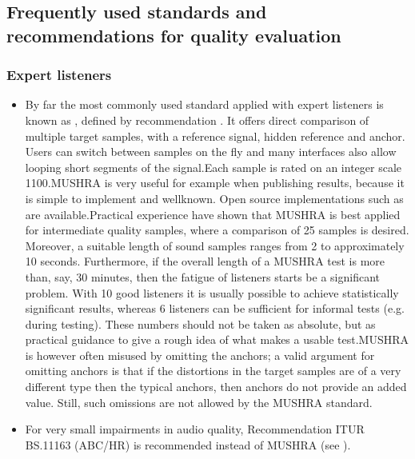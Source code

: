 \documentclass[letterpaper,10pt,english]{jupyterBook}
\begin{document}
\subsection{Frequently used standards and recommendations for quality evaluation}
\label{\detokenize{Evaluation/Subjective_quality_evaluation:frequently-used-standards-and-recommendations-for-quality-evaluation}}

\subsubsection{Expert listeners}
\label{\detokenize{Evaluation/Subjective_quality_evaluation:expert-listeners}}\begin{itemize}
\item {} 
\sphinxAtStartPar
By far the most commonly used standard applied with expert listeners
is known as , defined by
 recommendation
. It offers
direct comparison of multiple target samples, with a reference
signal, hidden reference and anchor. Users can switch between
samples on the fly and many interfaces also allow looping short
segments of the signal.Each sample is rated on an integer scale 1\sphinxhyphen{}100.MUSHRA is very useful for example when publishing results, because
it is simple to implement and well\sphinxhyphen{}known. Open source
implementations such as
are available.Practical experience have shown that MUSHRA is best applied for
intermediate quality samples, where a comparison of 2\sphinxhyphen{}5 samples is
desired. Moreover, a suitable length of sound samples ranges from 2
to approximately 10 seconds. Furthermore, if the overall length of a
MUSHRA test is more than, say, 30 minutes, then the fatigue of
listeners starts be a significant problem. With 10 good listeners it
is usually possible to achieve statistically significant results,
whereas 6 listeners can be sufficient for informal tests (e.g.
during testing). These numbers should not be taken as absolute, but
as practical guidance to give a rough idea of what makes a usable
test.MUSHRA is however often misused by omitting the anchors; a valid
argument for omitting anchors is that if the distortions in the
target samples are of a very different type then the typical
anchors, then anchors do not provide an added value. Still, such
omissions are not allowed by the MUSHRA standard.

\item {} 
\sphinxAtStartPar
For very small impairments in audio quality, Recommendation ITU\sphinxhyphen{}R
BS.1116\sphinxhyphen{}3 (ABC/HR) is recommended instead of MUSHRA (see
).

\end{itemize}
\end{document}

